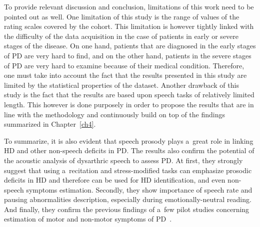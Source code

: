 To provide relevant discussion and conclusion, limitations of this work need to be pointed out as well. One limitation of this study is the range of values of the rating scales covered by the cohort. This limitation is however tightly linked with the difficulty of the data acquisition in the case of patients in early or severe stages of the disease. On one hand, patients that are diagnosed in the early stages of PD are very hard to find, and on the other hand, patients in the severe stages of PD are very hard to examine because of their medical condition. Therefore, one must take into account the fact that the results presented in this study are limited by the statistical properties of the dataset. Another drawback of this study is the fact that the results are based upon speech tasks of relatively limited length. This however is done purposely in order to propose the results that are in line with the methodology and continuously build on top of the findings summarized in Chapter~\ref{ch4}.

To summarize, it is also evident that speech prosody plays a~great role in linking HD and other non-speech deficits in PD. The results also confirm the potential of the acoustic analysis of dysarthric speech to assess PD. At first, they strongly suggest that using a~recitation and stress-modified tasks can emphasize prosodic deficits in HD and therefore can be used for HD identification, and even non-speech symptoms estimation. Secondly, they show importance of speech rate and pausing abnormalities description, especially during emotionally-neutral reading. And finally, they confirm the previous findings of a~few pilot studies concerning estimation of motor and non-motor symptoms of PD~\cite{Smekal2015c, Rektorova2016}.